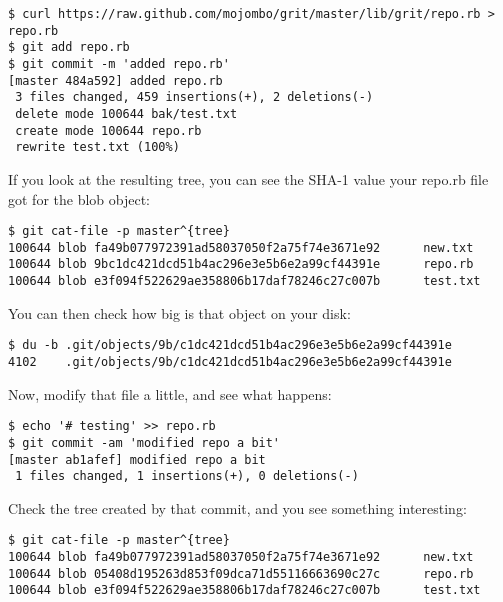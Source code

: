 \documentclass[a4paper]{book}
\begin{document}
\begin{shaded}\begin{verbatim}
$ curl https://raw.github.com/mojombo/grit/master/lib/grit/repo.rb > repo.rb
$ git add repo.rb
$ git commit -m 'added repo.rb'
[master 484a592] added repo.rb
 3 files changed, 459 insertions(+), 2 deletions(-)
 delete mode 100644 bak/test.txt
 create mode 100644 repo.rb
 rewrite test.txt (100%)
\end{verbatim}\end{shaded}

If you look at the resulting tree, you can see the SHA-1 value your repo.rb file got for the blob object:

\begin{shaded}\begin{verbatim}
$ git cat-file -p master^{tree}
100644 blob fa49b077972391ad58037050f2a75f74e3671e92      new.txt
100644 blob 9bc1dc421dcd51b4ac296e3e5b6e2a99cf44391e      repo.rb
100644 blob e3f094f522629ae358806b17daf78246c27c007b      test.txt
\end{verbatim}\end{shaded}

You can then check how big is that object on your disk:

\begin{shaded}\begin{verbatim}
$ du -b .git/objects/9b/c1dc421dcd51b4ac296e3e5b6e2a99cf44391e
4102	.git/objects/9b/c1dc421dcd51b4ac296e3e5b6e2a99cf44391e
\end{verbatim}\end{shaded}

Now, modify that file a little, and see what happens:

\begin{shaded}\begin{verbatim}
$ echo '# testing' >> repo.rb 
$ git commit -am 'modified repo a bit'
[master ab1afef] modified repo a bit
 1 files changed, 1 insertions(+), 0 deletions(-)
\end{verbatim}\end{shaded}

Check the tree created by that commit, and you see something interesting:

\begin{shaded}\begin{verbatim}
$ git cat-file -p master^{tree}
100644 blob fa49b077972391ad58037050f2a75f74e3671e92      new.txt
100644 blob 05408d195263d853f09dca71d55116663690c27c      repo.rb
100644 blob e3f094f522629ae358806b17daf78246c27c007b      test.txt
\end{verbatim}\end{shaded}
\end{document}
